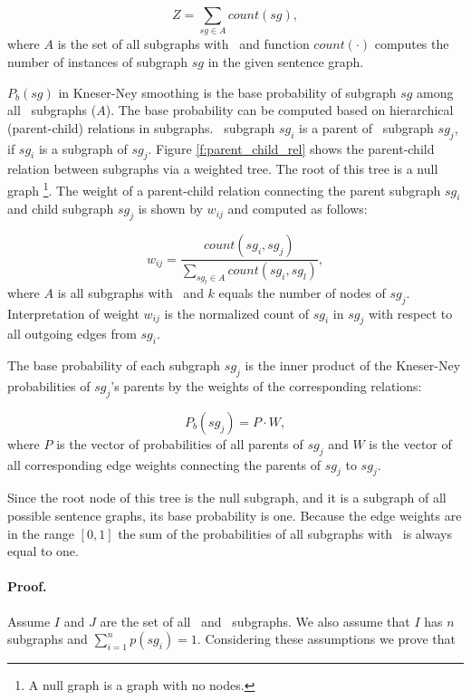 \begin{equation*}
Z = \sum_{sg \in A} count(sg),
\end{equation*}
%
where $A$ is the set of all subgraphs with \knodes\ and function
$count(\cdot)$ computes the number of instances of subgraph $sg$ in
the given sentence graph.

$P_b(sg)$ in Kneser-Ney smoothing is the base probability of
subgraph $sg$ among all \knode\ subgraphs ($A$). The base
probability can be computed based on hierarchical (parent-child)
relations in subgraphs. \knode\ subgraph $sg_i$ is a parent
of \kplusnode\ subgraph $sg_j$, if $sg_i$ is a subgraph of
$sg_j$. Figure \ref{f:parent_child_rel} shows the parent-child
relation between subgraphs via a weighted tree. The root of this tree
is a null graph
\footnote{A null graph is a graph with no nodes.}. 
The weight of a parent-child relation connecting the parent
subgraph $sg_i$ and child subgraph $sg_j$ is shown by $w_{ij}$ and
computed as follows:

\begin{equation*}
w_{ij} = \frac{count(sg_i, sg_j)}{\sum_{sg_l \in A}count(sg_i,sg_l)},
\end{equation*}
%
where $A$ is all subgraphs with \knode\ and $k$ equals the number of
nodes of $sg_j$. Interpretation of weight $w_{ij}$ is the normalized count of $sg_i$ in $sg_j$ with respect to all outgoing edges from $sg_i$.

The base probability of each subgraph $sg_j$ is the inner product
of the Kneser-Ney probabilities of $sg_j$'s parents by the weights of
the corresponding relations:

\begin{equation}
P_b(sg_j)  = P \cdot W,
\end{equation}
%
where $P$ is the vector of probabilities of all parents of 
$sg_j$ and $W$ is the vector of all corresponding edge weights
connecting the parents of $sg_j$ to $sg_j$.

Since the root node of this tree is the null subgraph, and it is a
subgraph of all possible sentence graphs, its base probability is
one. Because the edge weights are in the range $\left[0,1\right]$ the
sum of the probabilities of all subgraphs with \knode\ is always
equal to one.

\paragraph{Proof.} 
Assume $I$ and $J$ are the set of all \knode\ and \kplusnode\
subgraphs. We also assume that $I$ has $n$ subgraphs and $\sum_{i=1}^n
p(sg_i)=1$. Considering these assumptions we prove that

